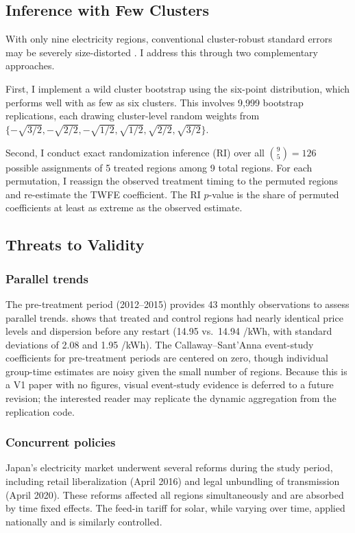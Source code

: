 \documentclass[12pt]{article}
\newcommand{\yen}{\textyen}
\begin{document}
\subsection{Inference with Few Clusters}

With only nine electricity regions, conventional cluster-robust standard errors may be severely size-distorted \citep{Cameron2008}. I address this through two complementary approaches.

First, I implement a wild cluster bootstrap using the \citet{Webb2023} six-point distribution, which performs well with as few as six clusters. This involves 9,999 bootstrap replications, each drawing cluster-level random weights from $\{-\sqrt{3/2}, -\sqrt{2/2}, -\sqrt{1/2}, \sqrt{1/2}, \sqrt{2/2}, \sqrt{3/2}\}$.

Second, I conduct exact randomization inference (RI) over all $\binom{9}{5} = 126$ possible assignments of 5 treated regions among 9 total regions. For each permutation, I reassign the observed treatment timing to the permuted regions and re-estimate the TWFE coefficient. The RI $p$-value is the share of permuted coefficients at least as extreme as the observed estimate.

\subsection{Threats to Validity}

\subsubsection*{Parallel trends} The pre-treatment period (2012--2015) provides 43 monthly observations to assess parallel trends.  shows that treated and control regions had nearly identical price levels and dispersion before any restart (14.95 vs.\ 14.94 \yen/kWh, with standard deviations of 2.08 and 1.95 \yen/kWh). The Callaway--Sant'Anna event-study coefficients for pre-treatment periods are centered on zero, though individual group-time estimates are noisy given the small number of regions. Because this is a V1 paper with no figures, visual event-study evidence is deferred to a future revision; the interested reader may replicate the dynamic aggregation from the replication code.

\subsubsection*{Concurrent policies} Japan's electricity market underwent several reforms during the study period, including retail liberalization (April 2016) and legal unbundling of transmission (April 2020). These reforms affected all regions simultaneously and are absorbed by time fixed effects. The feed-in tariff for solar, while varying over time, applied nationally and is similarly controlled.
\end{document}
